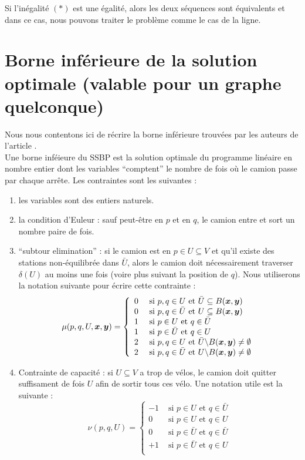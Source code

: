 \documentclass[twoside,11pt,openany,a4paper]{rapport}
\begin{document}
Si l'inégalité $(*)$ est une égalité, alors les deux séquences sont équivalents et dans ce cas, nous pouvons traiter le problème comme le cas de la ligne.

\section{Borne inférieure de la solution optimale (valable pour un graphe quelconque)}
\label{Borne inf générale}

Nous nous contentons ici de récrire la borne inférieure trouvées par les auteurs de l'article \cite{Benchimol2011}.
\\

Une borne inféieure du SSBP est la solution optimale du programme linéaire en nombre entier dont les variables ``comptent'' le nombre de fois où le camion passe par chaque arrête. Les contraintes sont les suivantes :
\begin{enumerate}[label=(\roman*)]
\item les variables sont des entiers naturels.
\item la condition d'Euleur : sauf peut-être en $p$ et en $q$, le camion entre et sort un nombre paire de fois.
\item ``subtour elimination'' : si le camion est en $p \in U \subseteq V $ et qu'il existe des stations non-équilibrée dans $\bar{U}$, alors le camion doit nécessairement traverser $\delta(U)$ au moins une fois (voire plus suivant la position de $q$). Nous utiliserons la notation suivante pour écrire cette contrainte :
\[
\mu(p,q,U,\boldsymbol{x},\boldsymbol{y}) = \left\{
\begin{array}{ll}
  0 &\mbox{ si } p,q \in U       \mbox{ et } \bar{U} \subseteq B(\boldsymbol{x},\boldsymbol{y})\\
  0 &\mbox{ si } p,q \in \bar{U} \mbox{ et } U \subseteq B(\boldsymbol{x},\boldsymbol{y})\\
  1 &\mbox{ si } p \in U         \mbox{ et } q \in \bar{U}\\
  1 &\mbox{ si } p \in \bar{U}   \mbox{ et } q \in U\\
  2 &\mbox{ si } p,q \in U       \mbox{ et } \bar{U} \backslash B(\boldsymbol{x},\boldsymbol{y}) \ne \emptyset\\
  2 &\mbox{ si } p,q \in \bar{U} \mbox{ et } U \backslash B(\boldsymbol{x},\boldsymbol{y}) \ne \emptyset
\end{array}
\right.
\]
\item Contrainte de capacité : si $U \subseteq V$ a trop de vélos, le camion doit quitter suffisament de fois $U$ afin de sortir tous ces vélo. Une notation utile est la suivante :
\[
\nu(p,q,U) = \left\{
\begin{array}{ll}
  -1 &\mbox{ si } p \in U       \mbox{ et } q \in \bar{U}\\
  0  &\mbox{ si } p \in U       \mbox{ et } q \in U\\
  0  &\mbox{ si } p \in \bar{U} \mbox{ et } q \in \bar{U}\\
  +1 &\mbox{ si } p \in \bar{U} \mbox{ et } q \in U\\
\end{array}
\right.
\]
\end{enumerate}
\end{document}
